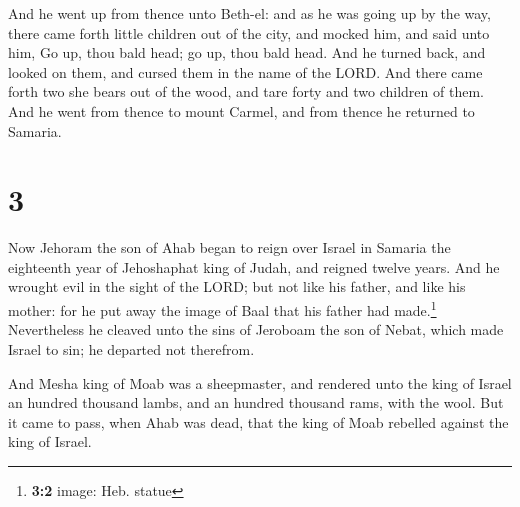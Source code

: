  And he went up from thence unto Beth-el: and as he was
going up by the way, there came forth little children out of the city,
and mocked him, and said unto him, Go up, thou bald head; go up, thou
bald head.  And he turned back, and looked on them, and
cursed them in the name of the LORD. And there came forth two she bears
out of the wood, and tare forty and two children of them.
 And he went from thence to mount Carmel, and from thence
he returned to Samaria.

\hypertarget{section-2}{%
\section{3}\label{section-2}}

 Now Jehoram the son of Ahab began to reign over Israel in
Samaria the eighteenth year of Jehoshaphat king of Judah, and reigned
twelve years.  And he wrought evil in the sight of the
LORD; but not like his father, and like his mother: for he put away the
image of Baal that his father had made.\footnote{\textbf{3:2} image:
  Heb. statue}  Nevertheless he cleaved unto the sins of
Jeroboam the son of Nebat, which made Israel to sin; he departed not
therefrom.

 And Mesha king of Moab was a sheepmaster, and rendered
unto the king of Israel an hundred thousand lambs, and an hundred
thousand rams, with the wool.  But it came to pass, when
Ahab was dead, that the king of Moab rebelled against the king of
Israel.

